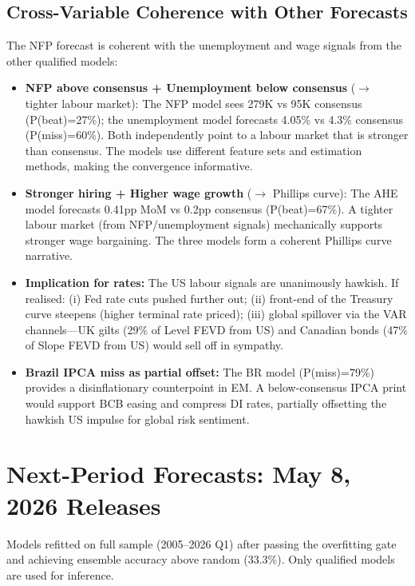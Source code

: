 \documentclass[11pt,a4paper]{article}
\begin{document}
\subsection*{Cross-Variable Coherence with Other Forecasts}
The NFP forecast is coherent with the unemployment and wage signals from the other qualified models:

\begin{itemize}[nosep, leftmargin=1.2em]
    \item \textbf{NFP above consensus + Unemployment below consensus} ($\rightarrow$ tighter labour market): The NFP model sees 279K vs 95K consensus (P(beat)=27\%); the unemployment model forecasts 4.05\% vs 4.3\% consensus (P(miss)=60\%). Both independently point to a labour market that is stronger than consensus. The models use different feature sets and estimation methods, making the convergence informative.
    \item \textbf{Stronger hiring + Higher wage growth} ($\rightarrow$ Phillips curve): The AHE model forecasts 0.41pp MoM vs 0.2pp consensus (P(beat)=67\%). A tighter labour market (from NFP/unemployment signals) mechanically supports stronger wage bargaining. The three models form a coherent Phillips curve narrative.
    \item \textbf{Implication for rates:} The US labour signals are unanimously hawkish. If realised: (i) Fed rate cuts pushed further out; (ii) front-end of the Treasury curve steepens (higher terminal rate priced); (iii) global spillover via the VAR channels---UK gilts (29\% of Level FEVD from US) and Canadian bonds (47\% of Slope FEVD from US) would sell off in sympathy.
    \item \textbf{Brazil IPCA miss as partial offset:} The BR model (P(miss)=79\%) provides a disinflationary counterpoint in EM. A below-consensus IPCA print would support BCB easing and compress DI rates, partially offsetting the hawkish US impulse for global risk sentiment.
\end{itemize}

\newpage

\section*{Next-Period Forecasts: May 8, 2026 Releases}

Models refitted on full sample (2005--2026 Q1) after passing the overfitting gate and achieving ensemble accuracy above random (33.3\%). Only qualified models are used for inference.
\end{document}
